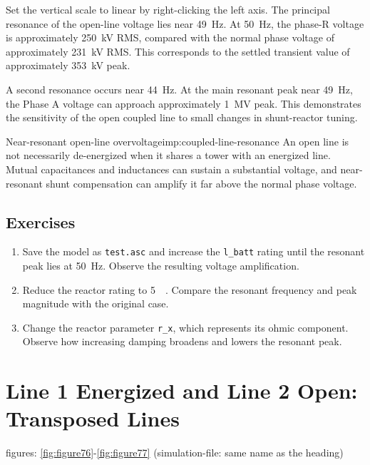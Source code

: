 Set the vertical scale to linear by right-clicking the left axis. The principal
resonance of the open-line voltage lies near \SI{49}{\hertz}. At
\SI{50}{\hertz}, the phase-R voltage is approximately
\SI{250}{\kilo\volt} RMS, compared with the normal phase voltage of
approximately \SI{231}{\kilo\volt} RMS. This corresponds to the settled
transient value of approximately \SI{353}{\kilo\volt} peak.

A second resonance occurs near \SI{44}{\hertz}. At the main resonant peak near
\SI{49}{\hertz}, the Phase A voltage can approach approximately
\SI{1}{\mega\volt} peak. This demonstrates the sensitivity of the open coupled
line to small changes in shunt-reactor tuning.

\begin{important}{Near-resonant open-line overvoltage}{imp:coupled-line-resonance}
An open line is not necessarily de-energized when it shares a tower with an
energized line. Mutual capacitances and inductances can sustain a substantial
voltage, and near-resonant shunt compensation can amplify it far above the
normal phase voltage.
\end{important}

\subsection{Exercises}

\begin{enumerate}
\item Save the model as \texttt{test.asc} and increase the
      \texttt{l\_batt} rating until the resonant peak lies at
      \SI{50}{\hertz}. Observe the resulting voltage amplification.
\item Reduce the reactor rating to \SI{5}{\mega\varunit}. Compare the resonant
      frequency and peak magnitude with the original case.
\item Change the reactor parameter \texttt{r\_x}, which represents its ohmic
      component. Observe how increasing damping broadens and lowers the
      resonant peak.
\end{enumerate}

\section{Line 1 Energized and Line 2 Open: Transposed Lines} figures: \ref{fig:figure76}-\ref{fig:figure77}  (simulation-file: same name as the heading) 
\label{sec:coupled-lines-open-transposed}

